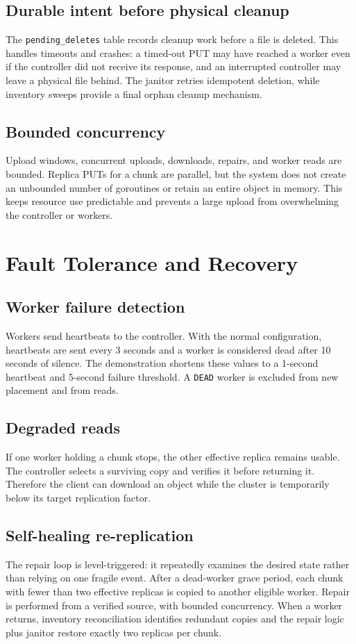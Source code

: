 \documentclass[11pt,a4paper]{article}
\begin{document}
\subsection{Durable intent before physical cleanup}
The \texttt{pending\_deletes} table records cleanup work before a file is deleted. This handles timeouts and crashes: a timed-out PUT may have reached a worker even if the controller did not receive its response, and an interrupted controller may leave a physical file behind. The janitor retries idempotent deletion, while inventory sweeps provide a final orphan cleanup mechanism.

\subsection{Bounded concurrency}
Upload windows, concurrent uploads, downloads, repairs, and worker reads are bounded. Replica PUTs for a chunk are parallel, but the system does not create an unbounded number of goroutines or retain an entire object in memory. This keeps resource use predictable and prevents a large upload from overwhelming the controller or workers.

\section{Fault Tolerance and Recovery}

\subsection{Worker failure detection}
Workers send heartbeats to the controller. With the normal configuration, heartbeats are sent every 3 seconds and a worker is considered dead after 10 seconds of silence. The demonstration shortens these values to a 1-second heartbeat and 5-second failure threshold. A \texttt{DEAD} worker is excluded from new placement and from reads.

\subsection{Degraded reads}
If one worker holding a chunk stops, the other effective replica remains usable. The controller selects a surviving copy and verifies it before returning it. Therefore the client can download an object while the cluster is temporarily below its target replication factor.

\subsection{Self-healing re-replication}
The repair loop is level-triggered: it repeatedly examines the desired state rather than relying on one fragile event. After a dead-worker grace period, each chunk with fewer than two effective replicas is copied to another eligible worker. Repair is performed from a verified source, with bounded concurrency. When a worker returns, inventory reconciliation identifies redundant copies and the repair logic plus janitor restore exactly two replicas per chunk.
\end{document}
